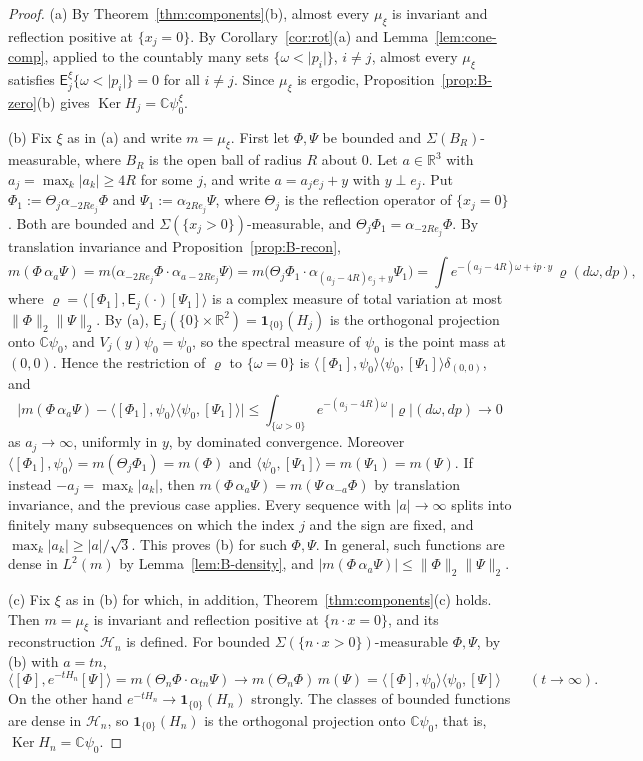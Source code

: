 \documentclass[11pt]{amsart}
\theoremstyle{plain}
\theoremstyle{definition}
\theoremstyle{remark}
\numberwithin{equation}{section}
\newcommand{\R}{\mathbb{R}}
\newcommand{\C}{\mathbb{C}}
\newcommand{\cH}{\mathcal{H}}
\newcommand{\abs}[1]{\lvert #1\rvert}
\newcommand{\norm}[1]{\lVert #1\rVert}
\newcommand{\ip}[2]{\langle #1,#2\rangle}
\newcommand{\Ker}{\operatorname{Ker}}
\begin{document}
\begin{proof}
(a) By Theorem~\ref{thm:components}(b), almost every $\mu_\xi$ is invariant and reflection positive at $\{x_j=0\}$. By Corollary~\ref{cor:rot}(a) and Lemma~\ref{lem:cone-comp}, applied to the countably many sets $\{\omega<\abs{p_i}\}$, $i\ne j$, almost every $\mu_\xi$ satisfies $\mathsf E^\xi_j\{\omega<\abs{p_i}\}=0$ for all $i\ne j$. Since $\mu_\xi$ is ergodic, Proposition~\ref{prop:B-zero}(b) gives $\Ker H_j=\C{\psi_0^\xi}$.

(b) Fix $\xi$ as in (a) and write $m=\mu_\xi$. First let $\Phi,\Psi$ be bounded and $\Sigma(B_R)$-measurable, where $B_R$ is the open ball of radius $R$ about $0$. Let $a\in\R^3$ with $a_j=\max_k\abs{a_k}\ge4R$ for some $j$, and write $a=a_je_j+y$ with $y\perp e_j$. Put $\Phi_1:=\Theta_j\alpha_{-2Re_j}\Phi$ and $\Psi_1:=\alpha_{2Re_j}\Psi$, where $\Theta_j$ is the reflection operator of $\{x_j=0\}$. Both are bounded and $\Sigma(\{x_j>0\})$-measurable, and $\Theta_j\Phi_1=\alpha_{-2Re_j}\Phi$. By translation invariance and Proposition~\ref{prop:B-recon},
\[
m(\Phi\,\alpha_a\Psi)=m\big(\alpha_{-2Re_j}\Phi\cdot\alpha_{a-2Re_j}\Psi\big)=m\big(\Theta_j\Phi_1\cdot\alpha_{(a_j-4R)e_j+y}\Psi_1\big)=\int e^{-(a_j-4R)\omega+ip\cdot y}\,\varrho(d\omega,dp),
\]
where $\varrho=\ip{[\Phi_1]}{\mathsf E_j(\cdot)[\Psi_1]}$ is a complex measure of total variation at most $\norm{\Phi}_2\norm\Psi_2$. By (a), $\mathsf E_j(\{0\}\times\R^2)=\mathbf 1_{\{0\}}(H_j)$ is the orthogonal projection onto $\C{\psi_0}$, and $V_j(y){\psi_0}={\psi_0}$, so the spectral measure of ${\psi_0}$ is the point mass at $(0,0)$. Hence the restriction of $\varrho$ to $\{\omega=0\}$ is $\ip{[\Phi_1]}{\psi_0}\ip{\psi_0}{[\Psi_1]}\delta_{(0,0)}$, and
\[
\Big|m(\Phi\,\alpha_a\Psi)-\ip{[\Phi_1]}{\psi_0}\ip{\psi_0}{[\Psi_1]}\Big|\le\int_{\{\omega>0\}}e^{-(a_j-4R)\omega}\,\abs\varrho(d\omega,dp)\longrightarrow0
\]
as $a_j\to\infty$, uniformly in $y$, by dominated convergence. Moreover $\ip{[\Phi_1]}{\psi_0}=m(\Theta_j\Phi_1)=m(\Phi)$ and $\ip{\psi_0}{[\Psi_1]}=m(\Psi_1)=m(\Psi)$. If instead $-a_j=\max_k\abs{a_k}$, then $m(\Phi\,\alpha_a\Psi)=m(\Psi\,\alpha_{-a}\Phi)$ by translation invariance, and the previous case applies. Every sequence with $\abs{a}\to\infty$ splits into finitely many subsequences on which the index $j$ and the sign are fixed, and $\max_k\abs{a_k}\ge\abs a/\sqrt3$. This proves (b) for such $\Phi,\Psi$. In general, such functions are dense in $L^2(m)$ by Lemma~\ref{lem:B-density}, and $\abs{m(\Phi\,\alpha_a\Psi)}\le\norm\Phi_2\norm\Psi_2$.

(c) Fix $\xi$ as in (b) for which, in addition, Theorem~\ref{thm:components}(c) holds. Then $m=\mu_\xi$ is invariant and reflection positive at $\{n\cdot x=0\}$, and its reconstruction $\cH_n$ is defined. For bounded $\Sigma(\{n\cdot x>0\})$-measurable $\Phi,\Psi$, by (b) with $a=tn$,
\[
\ip{[\Phi]}{e^{-tH_n}[\Psi]}=m(\Theta_n\Phi\cdot\alpha_{tn}\Psi)\longrightarrow m(\Theta_n\Phi)\,m(\Psi)=\ip{[\Phi]}{\psi_0}\ip{\psi_0}{[\Psi]}\qquad(t\to\infty).
\]
On the other hand $e^{-tH_n}\to\mathbf 1_{\{0\}}(H_n)$ strongly. The classes of bounded functions are dense in $\cH_n$, so $\mathbf 1_{\{0\}}(H_n)$ is the orthogonal projection onto $\C{\psi_0}$, that is, $\Ker H_n=\C{\psi_0}$.
\end{proof}
\end{document}
